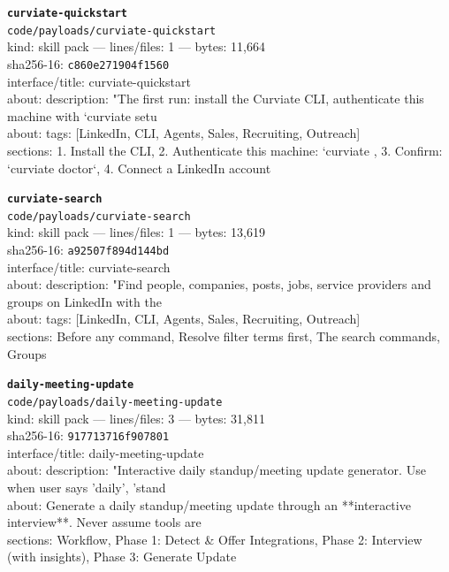 \noindent\textbf{\texttt{curviate-quickstart}}\\
\texttt{code/payloads/curviate-quickstart}\\
kind: skill pack --- lines/files: 1 --- bytes: 11,664\\
sha256-16: \texttt{c860e271904f1560}\\
interface/title: curviate-quickstart\\
about: description: "The first run: install the Curviate CLI, authenticate this machine with `curviate setu\\
about: tags: [LinkedIn, CLI, Agents, Sales, Recruiting, Outreach]\\
sections: 1. Install the CLI, 2. Authenticate this machine: `curviate , 3. Confirm: `curviate doctor`, 4. Connect a LinkedIn account\\
\vspace*{6.0pt}

\noindent\textbf{\texttt{curviate-search}}\\
\texttt{code/payloads/curviate-search}\\
kind: skill pack --- lines/files: 1 --- bytes: 13,619\\
sha256-16: \texttt{a92507f894d144bd}\\
interface/title: curviate-search\\
about: description: "Find people, companies, posts, jobs, service providers and groups on LinkedIn with the\\
about: tags: [LinkedIn, CLI, Agents, Sales, Recruiting, Outreach]\\
sections: Before any command, Resolve filter terms first, The search commands, Groups\\
\vspace*{6.0pt}

\noindent\textbf{\texttt{daily-meeting-update}}\\
\texttt{code/payloads/daily-meeting-update}\\
kind: skill pack --- lines/files: 3 --- bytes: 31,811\\
sha256-16: \texttt{917713716f907801}\\
interface/title: daily-meeting-update\\
about: description: "Interactive daily standup/meeting update generator. Use when user says 'daily', 'stand\\
about: Generate a daily standup/meeting update through an **interactive interview**. Never assume tools are\\
sections: Workflow, Phase 1: Detect \& Offer Integrations, Phase 2: Interview (with insights), Phase 3: Generate Update\\
\vspace*{6.0pt}

